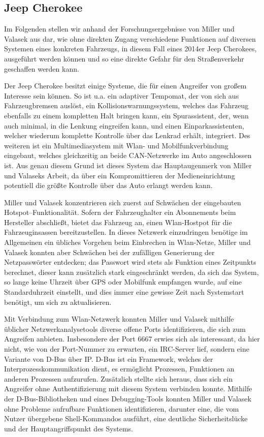 \documentclass[
    fontsize=12pt,
    headings=small,
    parskip=half,           %
    bibliography=totoc,9
    numbers=noenddot,       %
    open=any,               %
    ]{scrreprt}
\begin{document}
\subsection{Jeep Cherokee}
Im Folgenden stellen wir anhand der Forschungsergebnisse von Miller und Valasek aus \cite{MiV15} dar, wie ohne direkten Zugang verschiedene Funktionen auf diversen Systemen eines konkreten Fahrzeugs, in diesem Fall eines 2014er Jeep Cherokees, ausgeführt werden können und so eine direkte Gefahr für den Straßenverkehr geschaffen werden kann. \par
Der Jeep Cherokee besitzt einige Systeme, die für einen Angreifer von großem Interesse sein können. So ist u.a. ein adaptiver Tempomat, der von sich aus Fahrzeugbremsen auslöst, ein Kollisionswarnungssystem, welches das Fahrzeug ebenfalls zu einem kompletten Halt bringen kann, ein Spurassistent, der, wenn auch minimal, in die Lenkung eingreifen kann, und einen Einparkassistenten, welcher wiederum komplette Kontrolle über das Lenkrad erhält, integriert. Des weiteren ist ein Multimediasystem mit Wlan- und Mobilfunkverbindung eingebaut, welches gleichzeitig an beide CAN-Netzwerke im Auto angeschlossen ist. Aus genau diesem Grund ist dieses System das Hauptaugenmerk von Miller und Valaseks Arbeit, da über ein Kompromittieren der Medieneinrichtung potentiell die größte Kontrolle über das Auto erlangt werden kann. \par
Miller und Valasek konzentrieren sich zuerst auf Schwächen der eingebauten Hotspot--Funktionalität. Sofern der Fahrzeughalter ein Abonnements beim Hersteller abschließt, bietet das Fahrzeug an, einen Wlan-Hostpot für die Fahrzeuginsassen bereitzustellen. In dieses Netzwerk einzudringen benötige im Allgemeinen ein übliches Vorgehen beim Einbrechen in Wlan-Netze, Miller und Valasek konnten aber Schwächen bei der zufälligen Generierung der Netzpasswörter entdecken; das Passwort wird stets als Funktion eines Zeitpunkts berechnet, dieser kann zusätzlich stark eingeschränkt werden, da sich das System, so lange keine Uhrzeit über GPS oder Mobilfunk empfangen wurde, auf eine Standarduhrzeit einstellt, und dies immer eine gewisse Zeit nach Systemstart benötigt, um sich zu aktualisieren. \par
Mit Verbindung zum Wlan-Netzwerk konnten Miller und Valasek mithilfe üblicher Netzwerkanalysetools diverse offene Ports identifizieren, die sich zum Angreifen anbieten. Insbesondere der Port 6667 erwies sich als interessant, da hier nicht, wie von der Port-Nummer zu erwarten, ein IRC-Server lief, sondern eine Variante von D-Bus über IP. D-Bus ist ein Framework, welches der Interprozesskommunikation dient, es ermöglicht Prozessen, Funktionen an anderen Prozessen aufzurufen. Zusätzlich stellte sich heraus, dass sich ein Angreifer ohne Authentifizierung mit diesem System verbinden konnte. Mithilfe der D-Bus-Bibliotheken und eines Debugging-Tools konnten Miller und Valasek ohne Probleme aufrufbare Funktionen identifizieren, darunter eine, die vom Nutzer übergebene Shell-Kommandos ausführt, eine deutliche Sicherheitslücke und der Hauptangriffspunkt des Systems. \par
\end{document}
